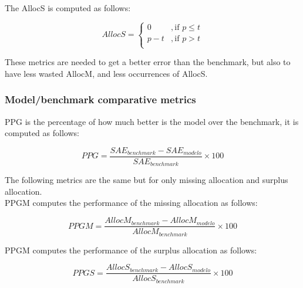 The \gls{AllocS} is computed as follows:

\begin{linenomath}
    \begin{equation}\label{eq:AllocS}
        AllocS = 
        \begin{cases} 
            0 & , \text{if } p \leq t \\
            p - t  & , \text{if } p > t \\
        \end{cases} 
            \end{equation}
    \end{linenomath}
		
These metrics are needed to get a better error than the benchmark, but also to have less wasted \gls{AllocM}, and less occurrences of \gls{AllocS}.\par

\subsubsection{Model/benchmark comparative metrics}

\gls{PPG} is the percentage of how much better is the model over the benchmark, it is computed as follows: 
\begin{linenomath}
    \begin{equation}\label{eq:PPG}
        PPG = \frac{SAE_{benchmark} - SAE_{modelo}}{SAE_{benchmark}} \times 100
    \end{equation}
    \end{linenomath}
		
The following metrics are the same but for only missing allocation and surplus allocation.\\
\gls{PPGM} computes the performance of the missing allocation as follows:\\

\begin{linenomath}
    \begin{equation}\label{eq:PPGM}
        PPGM = \frac{AllocM_{benchmark} - AllocM_{modelo}}{AllocM_{benchmark}} \times 100
    \end{equation}
    \end{linenomath}
		
\gls{PPGM} computes the performance of the surplus allocation as follows:

\begin{linenomath}
    \begin{equation}\label{eq:PPGS}
        PPGS = \frac{AllocS_{benchmark} - AllocS_{modelo}}{AllocS_{benchmark}} \times 100
    \end{equation}
    \end{linenomath}

